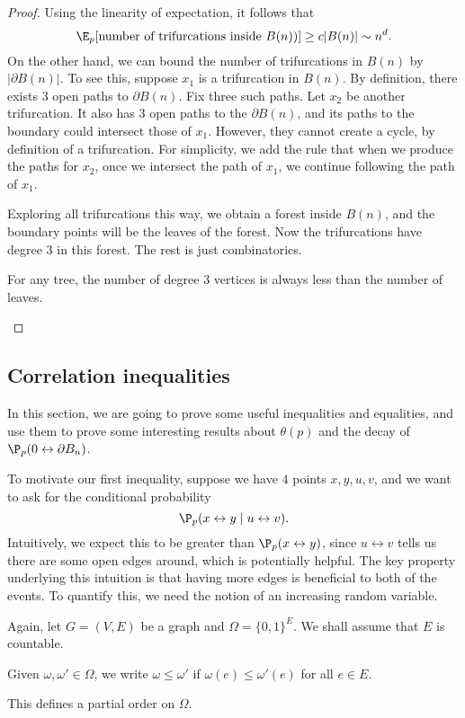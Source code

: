 \documentclass[a4paper]{article}
\begin{document}
\begin{proof}
  Using the linearity of expectation, it follows that
  \[
    \E_p[\text{number of trifurcations inside $B(n)$})] \geq c |B(n)| \sim n^d.
  \]
  On the other hand, we can bound the number of trifurcations in $B(n)$ by $|\partial B(n)|$. To see this, suppose $x_1$ is a trifurcation in $B(n)$. By definition, there exists $3$ open paths to $\partial B(n)$. Fix three such paths. Let $x_2$ be another trifurcation. It also has $3$ open paths to the $\partial B(n)$, and its paths to the boundary could intersect those of $x_1$. However, they cannot create a cycle, by definition of a trifurcation. For simplicity, we add the rule that when we produce the paths for $x_2$, once we intersect the path of $x_1$, we continue following the path of $x_1$.

  Exploring all trifurcations this way, we obtain a forest inside $B(n)$, and the boundary points will be the leaves of the forest. Now the trifurcations have degree $3$ in this forest. The rest is just combinatorics.
  \begin{ex}
    For any tree, the number of degree $3$ vertices is always less than the number of leaves.\qedhere %
  \end{ex}
\end{proof}

\subsection{Correlation inequalities}
In this section, we are going to prove some useful inequalities and equalities, and use them to prove some interesting results about $\theta(p)$ and the decay of $\P_p(0 \leftrightarrow \partial B_n)$.

To motivate our first inequality, suppose we have $4$ points $x, y, u, v$, and we want to ask for the conditional probability
\[
  \P_p(x \leftrightarrow y \mid u \leftrightarrow v).
\]
Intuitively, we expect this to be greater than $\P_p(x \leftrightarrow y)$, since $u \leftrightarrow v$ tells us there are some open edges around, which is potentially helpful. The key property underlying this intuition is that having more edges is beneficial to both of the events. To quantify this, we need the notion of an increasing random variable.

Again, let $G = (V, E)$ be a graph and $\Omega = \{0, 1\}^E$. We shall assume that $E$ is countable.

\begin{notation}[$\leq$]\index{$\leq$}
  Given $\omega, \omega' \in \Omega$, we write $\omega \leq \omega'$ if $\omega(e) \leq \omega'(e)$ for all $e \in E$.
\end{notation}
This defines a partial order on $\Omega$.
\end{document}
